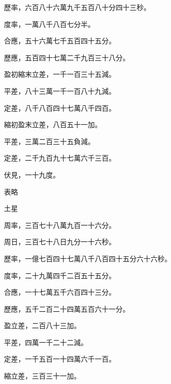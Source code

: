 \begin{pinyinscope}
 歷率，六百八十六萬九千五百八十分四十三秒。



 度率，一萬八千八百七分半。



 合應，五十六萬七千五百四十五分。



 歷應，五百四十七萬二千九百三十八分。



 盈初縮末立差，一千一百三十五減。



 平差，八十三萬一千一百八十九減。



 定差，八千八百四十七萬八千四百。



 縮初盈末立差，八百五十一加。



 平差，三萬二百三十五負減。



 定差，二千九百九十七萬六千三百。



 伏見，一十九度。



 表略



 土星



 周率，三百七十八萬九百一十六分。



 周日，三百七十八日九分一十六秒。



 歷率，一億七百四十七萬八千八百四十五分六十六秒。



 度率，二十九萬四千二百五十五分。



 合應，一十七萬五千六百四十三分。



 歷應，五千二百二十四萬五百六十一分。



 盈立差，二百八十三加。



 平差，四萬一千二十二減。



 定差，一千五百一十四萬六千一百。



 縮立差，三百三十一加。




\end{pinyinscope}
